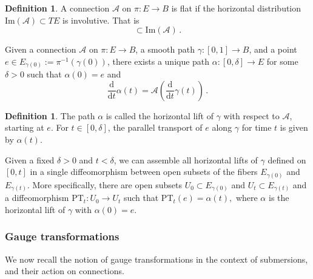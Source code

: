 \documentclass{article}
\theoremstyle{definition}
\newtheorem{definition}[theorem]{Definition}
\numberwithin{equation}{section}
\begin{document}
\begin{definition}\label{flatdef}
    A connection $\mathcal{A}$ on $\pi:E\to B$ is flat if the horizontal distribution $\text{Im}(\mathcal{A})\subset TE$ is involutive. That is 
    \begin{equation*}
        [\text{Im}(\mathcal{A}), \text{Im}(\mathcal{A})]\subset \text{Im}(\mathcal{A})\,.
    \end{equation*}
\end{definition}
Given a connection $\mathcal{A}$ on $\pi:E\to B$, a smooth path $\gamma:[0,1]\to B$, and a point $e\in E_{\gamma(0)}:=\pi^{-1}(\gamma(0))$, there exists a unique path $\alpha:[0,\delta]\to E$ for some $\delta>0$ such that $\alpha(0)=e$ and 
\begin{equation*}
    \frac{\mathrm{d}}{\mathrm{d}t}\alpha(t)= \mathcal{A}\left(\frac{\mathrm{d}}{\mathrm{d}t}\gamma(t)\right)\,.
\end{equation*}
\begin{definition}
    The path $\alpha$ is called the horizontal lift of $\gamma$ with respect to $\mathcal{A}$, starting at $e$. For $t\in [0,\delta]$, the parallel transport of $e$ along $\gamma$ for time $t$ is given by $\alpha(t)$.
\end{definition}
Given a fixed $\delta>0$ and $t<\delta$, we can assemble all horizontal lifts of $\gamma$ defined on $[0,t]$ in a single diffeomorphism between open subsets of the fibers $E_{\gamma(0)}$ and $E_{\gamma(t)}$. More specifically, there are open subsets $U_{0}\subset E_{\gamma(0)}$ and $U_t\subset E_{\gamma(t)}$ and a diffeomorphism $\text{PT}_t:U_0\to U_t$ such that $\text{PT}_t(e)=\alpha(t),$ where $\alpha$ is the horizontal lift of $\gamma$ with $\alpha(0)=e.$

\subsubsection{Gauge transformations}
We now recall the notion of gauge transformations in the context of submersions, and their action on connections. 
\end{document}
